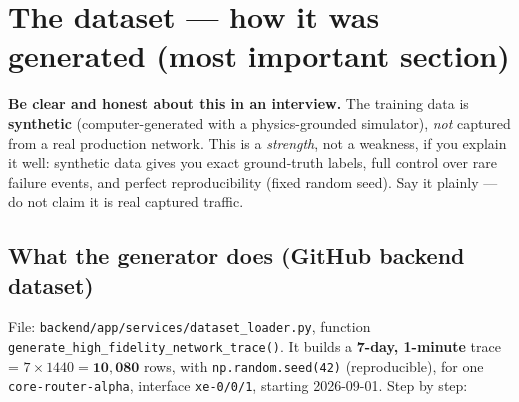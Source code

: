\documentclass[11pt,a4paper]{article}
\newcommand{\warn}[1]{%
  \par\vspace{3pt}\noindent
  \colorbox{warnbg}{\parbox{\dimexpr\linewidth-2\fboxsep}{\small #1}}%
  \par\vspace{3pt}}
\begin{document}
\section{The dataset --- how it was generated (most important section)}
\warn{\textbf{Be clear and honest about this in an interview.} The training data is \textbf{synthetic}
(computer-generated with a physics-grounded simulator), \emph{not} captured from a real production network.
This is a \emph{strength}, not a weakness, if you explain it well: synthetic data gives you exact ground-truth
labels, full control over rare failure events, and perfect reproducibility (fixed random seed). Say it
plainly --- do not claim it is real captured traffic.}

\subsection{What the generator does (GitHub backend dataset)}
File: \texttt{backend/app/services/dataset\_loader.py}, function
\texttt{generate\_high\_fidelity\_network\_trace()}. It builds a \textbf{7-day, 1-minute} trace =
$7\times1440 = \mathbf{10{,}080}$ rows, with \texttt{np.random.seed(42)} (reproducible), for one
\texttt{core-router-alpha}, interface \texttt{xe-0/0/1}, starting 2026-09-01. Step by step:
\end{document}
